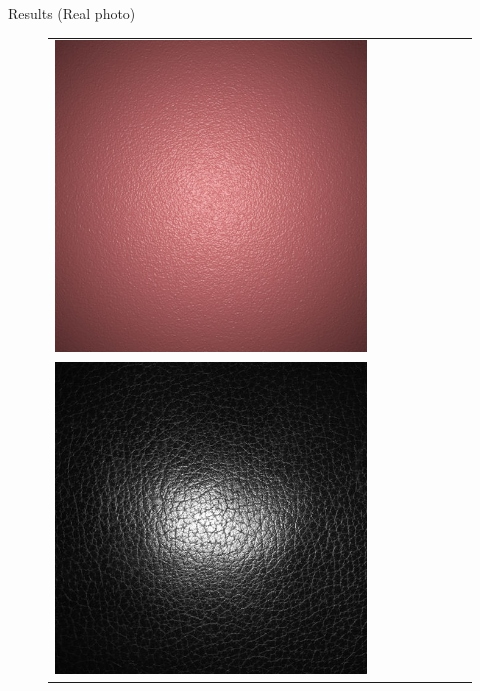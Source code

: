 \documentclass[final]{beamer}
\newlength{\twocolwid}
\newlength{\resultwidth}
\begin{document}
\begin{frame}[t]
\begin{columns}[t]
\begin{column}{\twocolwid}
\begin{block}{Results (Real photo)}
\begin{figure}[t]
\begin{tabular}{ccrclccc}
            		\includegraphics[width=\resultwidth]{images/real/bump/bad1.jpg}
            		\\
            		\includegraphics[width=\resultwidth]{images/real/leather/target.jpg} &

\end{tabular}
\end{figure}
\end{block}
\end{column}
\end{columns}
\end{frame}
\end{document}
